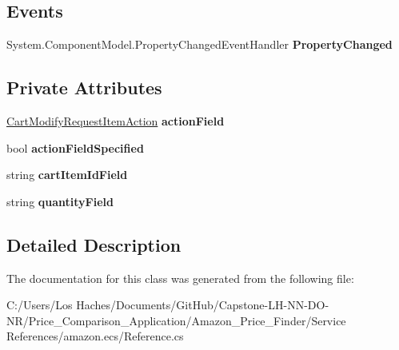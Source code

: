 \subsection*{Events}
\begin{DoxyCompactItemize}
\item 
\hypertarget{class_price___comparison_1_1amazon_1_1ecs_1_1_cart_modify_request_item_aa3e016ea143410be8874dfbf2c32a9f4}{System.\-Component\-Model.\-Property\-Changed\-Event\-Handler {\bfseries Property\-Changed}}\label{class_price___comparison_1_1amazon_1_1ecs_1_1_cart_modify_request_item_aa3e016ea143410be8874dfbf2c32a9f4}

\end{DoxyCompactItemize}
\subsection*{Private Attributes}
\begin{DoxyCompactItemize}
\item 
\hypertarget{class_price___comparison_1_1amazon_1_1ecs_1_1_cart_modify_request_item_aacc6e72d2b9c1c8ef0b815db9eb3c835}{\hyperlink{namespace_price___comparison_1_1amazon_1_1ecs_ae0beff481ffcf2e08d6d04c87a9584e1}{Cart\-Modify\-Request\-Item\-Action} {\bfseries action\-Field}}\label{class_price___comparison_1_1amazon_1_1ecs_1_1_cart_modify_request_item_aacc6e72d2b9c1c8ef0b815db9eb3c835}

\item 
\hypertarget{class_price___comparison_1_1amazon_1_1ecs_1_1_cart_modify_request_item_a71ea06c4ecad8c6f613d9dcb9970cadb}{bool {\bfseries action\-Field\-Specified}}\label{class_price___comparison_1_1amazon_1_1ecs_1_1_cart_modify_request_item_a71ea06c4ecad8c6f613d9dcb9970cadb}

\item 
\hypertarget{class_price___comparison_1_1amazon_1_1ecs_1_1_cart_modify_request_item_a7dc106f0c28b44917112e050bfb9f0f4}{string {\bfseries cart\-Item\-Id\-Field}}\label{class_price___comparison_1_1amazon_1_1ecs_1_1_cart_modify_request_item_a7dc106f0c28b44917112e050bfb9f0f4}

\item 
\hypertarget{class_price___comparison_1_1amazon_1_1ecs_1_1_cart_modify_request_item_ae00b9a49daa998f60a1d63ec055af98c}{string {\bfseries quantity\-Field}}\label{class_price___comparison_1_1amazon_1_1ecs_1_1_cart_modify_request_item_ae00b9a49daa998f60a1d63ec055af98c}

\end{DoxyCompactItemize}


\subsection{Detailed Description}


The documentation for this class was generated from the following file\-:\begin{DoxyCompactItemize}
\item 
C\-:/\-Users/\-Los Haches/\-Documents/\-Git\-Hub/\-Capstone-\/\-L\-H-\/\-N\-N-\/\-D\-O-\/\-N\-R/\-Price\-\_\-\-Comparison\-\_\-\-Application/\-Amazon\-\_\-\-Price\-\_\-\-Finder/\-Service References/amazon.\-ecs/Reference.\-cs\end{DoxyCompactItemize}

